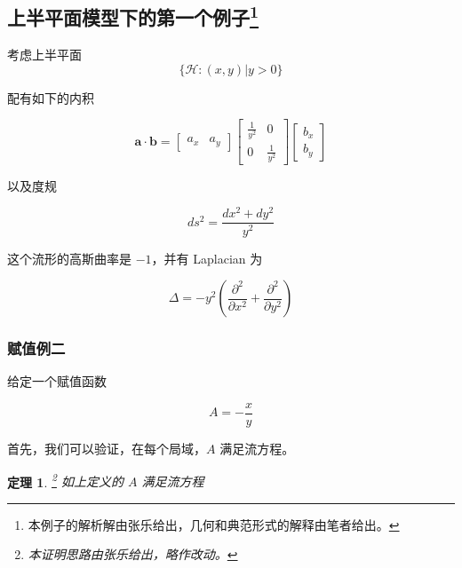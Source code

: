 \documentclass[a4paper,12pt]{article}
\numberwithin{definition}{section}
\numberwithin{lemma}{section}
\numberwithin{proposition}{section}
\newtheorem{theorem}{定理}
\numberwithin{theorem}{section}
\numberwithin{grammar}{section}
\numberwithin{program}{section}
\numberwithin{convention}{section}
\numberwithin{corollary}{section}
\begin{document}
\subsection{上半平面模型下的第一个例子\footnote{本例子的解析解由张乐给出，几何和典范形式的解释由笔者给出。}}

考虑上半平面
\[
\{\mathcal{H}: (x, y) | y > 0 \}
\]

配有如下的内积

\[
\mathbf{a} \cdot \mathbf{b} = \begin{bmatrix} a_x & a_y \end{bmatrix} \begin{bmatrix} \frac{1}{y^2} & 0 \\ 0 & \frac{1}{y^2} \end{bmatrix} \begin{bmatrix} b_x \\ b_y \end{bmatrix}
\]

以及度规

\[
ds^2 = \frac{dx^2 + dy^2}{y^2}
\]

这个流形的高斯曲率是 $-1$，并有 Laplacian 为

\[
\Delta = - y^2 (\frac{\partial^2}{\partial x^2} + \frac{\partial^2}{\partial y^2})
\]

\subsubsection{赋值例二}\label{subsec:exmp2}

给定一个赋值函数

\begin{equation}
A = - \frac{x}{y}
\end{equation}

首先，我们可以验证，在每个局域，$A$ 满足流方程。

\begin{theorem}\footnote{本证明思路由张乐给出，略作改动。}
如上定义的 $A$ 满足流方程
\end{theorem}
\end{document}
